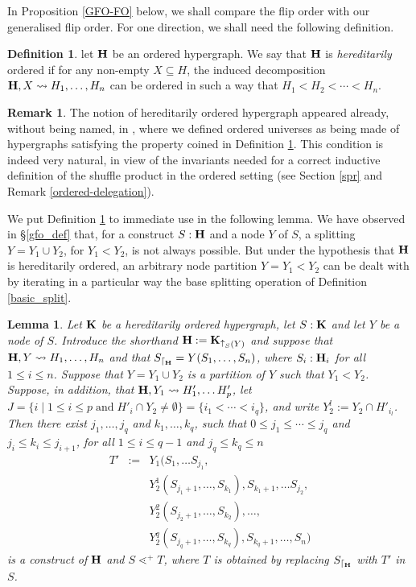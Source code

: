 \documentclass{article}
\theoremstyle{plain}
\newtheorem{lemma}[thm]{Lemma}
\theoremstyle{definition}
\newtheorem{definition}[thm]{Definition}
\newtheorem{remark}[thm]{Remark}
\newcommand{\inc}{\subseteq}
\newcommand{\set}[1]{\{#1\}}
\newcommand{\setc}[2]{\set{#1 \mid #2}}
\newcommand{\hyper}[1]{{\bf #1}}
\newcommand{\restrconstr}[2]{{#1}_{\lceil_{#2}}}
\def\mathraise#1#2#3#4{
\mathchoice
{\raisebox{#2}{$\displaystyle{#1}$}}
{\raisebox{#2}{$#1$}}
{\raisebox{#3}{$\scriptstyle{#1}$}}
{\raisebox{#4}{$\scriptscriptstyle{#1}$}}
}
\def\mathraiseord#1#2#3#4{\mathord{\mathraise#1{#2}{#3}{#4}}}
\def\valup{\mathraiseord{\uparrow}{0.29ex}{0.21ex}{0.16ex}}
\begin{document}
In Proposition \ref{GFO-FO} below, we shall compare the flip order with our generalised flip order. For one direction, we shall need the following definition.
\begin{definition} \label{hereditarily-ordered-def}
let $\hyper{H}$ be an ordered hypergraph. We say that $\hyper{H}$ is {\em hereditarily} ordered if for
any non-empty $X\inc H$, the induced decomposition $\hyper{H},X\leadsto H_1,\ldots,H_n$ can be ordered in such a way that $H_1<H_2<\cdots<H_n$.
\end{definition}
\begin{remark} The notion of hereditarily ordered hypergraph appeared already, without being named, in \cite{PLBJ1}, where we defined ordered universes as being made of hypergraphs satisfying the property coined in Definition \ref{hereditarily-ordered-def}. This condition is indeed very natural, in view of the invariants needed for a correct inductive definition of the shuffle product in the ordered setting (see Section \ref{spr} and Remark \ref{ordered-delegation}).
\end{remark}
We put Definition \ref {hereditarily-ordered-def} to immediate use in the following lemma. We have observed in \S \ref{gfo_def} that, for a construct $S:{\bf H}$ and a node $Y$ of $S$, a splitting $Y=Y_1\cup Y_2$, for $Y_1<Y_2$, is not always possible. But under the hypothesis that $\hyper{H}$ is hereditarily ordered, an
 arbitrary node partition $Y=Y_1 < Y_2$ can be dealt with by iterating in a particular way the base splitting operation of Definition \ref{basic_split}. 
\begin{lemma} \label{squashing-lemma}
Let $\hyper{K}$ be a hereditarily ordered hypergraph, let $S:\hyper{K}$ and let $Y$ be a node of $S$. Introduce the shorthand ${\bf H}:={\bf K}_{\valup_S(Y)}$ and suppose that ${\bf H},Y\leadsto H_1,\dots,H_n$ and that $\restrconstr{S}{{\bf H}}=Y(S_1,\ldots,S_n)$, where $S_i:{\bf H}_i$ for all $1\leq i\leq n$. Suppose that $Y=Y_1\cup Y_2$ is a partition of $Y$ such that $Y_1<Y_2$. Suppose, in addition, that ${\bf H},Y_1 \leadsto H'_1,\ldots H'_p$, let $J=\setc{i}{1\leq i\leq p \;\textrm{and} \;H'_i\cap Y_2\neq\emptyset}=\set{i_1<\cdots <i_q}$, and write $Y_2^l := Y_2\cap H'_{i_l}$. Then there exist $j_1,\ldots , j_q$ and $k_1,\ldots,k_q$, such that $0\leq j_1\leq \cdots \leq j_q$ and 
$j_i\leq k_i\leq j_{i+1}$, for all $1\leq i\leq q-1$ and $j_q\leq k_q\leq n$$$\begin{array}{lll}
T' & := &Y_1(S_1,\ldots S_{j_1},\\
&& Y_2^{1}(S_{j_1+1},\ldots,S_{k_1}),S_{k_1+1},\ldots S_{j_2},\\
&& Y_2^{2}(S_{j_2+1},\ldots,S_{k_2}),\ldots, \\
&&Y_2^{q}(S_{j_q+1},\ldots,S_{k_q}),S_{k_q+1},\ldots, S_n)
\end{array}$$
is a construct of $\hyper{H}$ and
$S\lessdot^+ T$, where $T$ is obtained by replacing $\restrconstr{S}{{\bf H}}$ with $T'$ in $S$.
\end{lemma}
\end{document}
